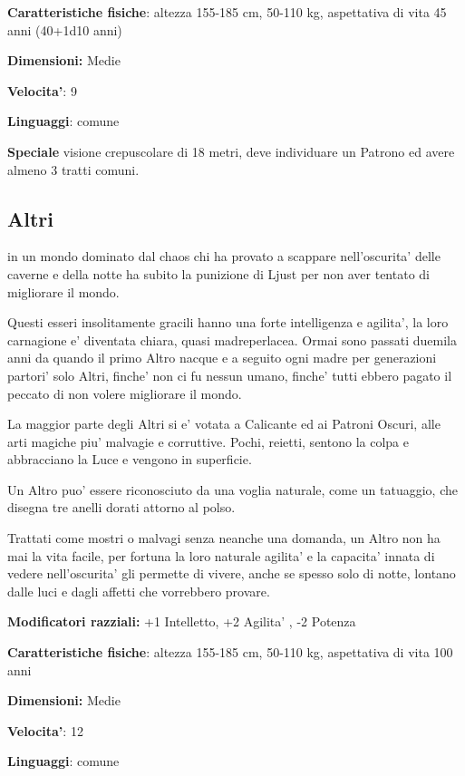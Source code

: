 \documentclass[a4paper,11pt,twoside,openany]{dndbook}
\begin{document}
\textbf{Caratteristiche fisiche}: altezza 155-185 cm, 50-110 kg, aspettativa di vita 45 anni (40+1d10 anni)

\textbf{Dimensioni:} Medie

\textbf{Velocita'}: 9

\textbf{Linguaggi}: comune

\textbf{Speciale} visione crepuscolare di 18 metri, deve individuare un Patrono ed avere almeno 3 tratti comuni.

\subsection{Altri}

\label{altri}

in un mondo dominato dal chaos chi ha provato a scappare nell'oscurita' delle caverne e della notte ha subito la punizione di Ljust per non aver tentato di migliorare il mondo.

Questi esseri insolitamente gracili hanno una forte intelligenza e agilita', la loro carnagione e' diventata chiara, quasi madreperlacea. Ormai sono passati duemila anni da quando il primo Altro nacque e a seguito ogni madre per generazioni partori' solo Altri, finche' non ci fu nessun umano, finche' tutti ebbero pagato il peccato di non volere migliorare il mondo.

La maggior parte degli Altri si e' votata a Calicante ed ai Patroni Oscuri, alle arti magiche piu' malvagie e corruttive. Pochi, reietti, sentono la colpa e abbracciano la Luce e vengono in superficie.

Un Altro puo' essere riconosciuto da una voglia naturale, come un tatuaggio, che disegna tre anelli dorati attorno al polso.

Trattati come mostri o malvagi senza neanche una domanda, un Altro non ha mai la vita facile, per fortuna la loro naturale agilita' e la capacita' innata di vedere nell'oscurita' gli permette di vivere, anche se spesso solo di notte, lontano dalle luci e dagli affetti che vorrebbero provare.

\textbf{Modificatori razziali:} +1 Intelletto, +2 Agilita' , -2 Potenza

\textbf{Caratteristiche fisiche}: altezza 155-185 cm, 50-110 kg, aspettativa
di vita 100 anni

\textbf{Dimensioni:} Medie

\textbf{Velocita'}: 12

\textbf{Linguaggi}: comune
\end{document}

